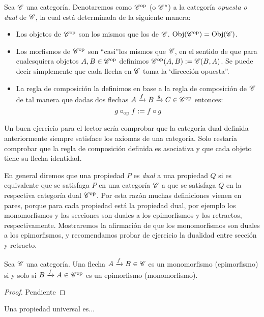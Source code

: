 \documentclass{comunicaciones}
\begin{document}
\begin{dfn}
    Sea $\mathscr C$ una categoría. Denotaremos como $\mathscr C^{\mathrm{op}}$ (o $\mathscr C^\ast$) a la categoría \emph{opuesta o dual} de $\mathscr C$, la cual está determinada de la siguiente manera:
    \begin{itemize}
        \item Los objetos de $\mathscr C^{\mathrm{op}}$ son los mismos que los de $\mathscr C$. $\mathrm{Obj}(\mathscr C^{\mathrm{op}})=\mathrm{Obj}(\mathscr C)$.
        \item Los morfismos de $\mathscr C^{\mathrm{op}}$ son \textquotedblleft casi\textquotedblright  los mismos que $\mathscr C$, en el sentido de que para cualesquiera
        objetos $A,B\in\mathscr C^{\mathrm{op}}$ definimos $\mathscr C^{\mathrm{op}}(A,B):=\mathscr C(B,A)$. Se puede decir simplemente que cada flecha en $\mathscr C$ toma la \textquoteleft dirección opuesta\textquotedblright .
        \item La regla de composición la definimos en base a la regla de composición de $\mathscr C$ de tal manera que dadas dos flechas $A\xrightarrow{f}B\xrightarrow{g}C\in\mathscr C^{\mathrm{op}}$ entonces:
        $$g\circ_{\mathrm{op}} f:=f\circ g$$
    \end{itemize}
\end{dfn}

Un buen ejercicio para el lector sería comprobar que la categoría dual definida anteriormente siempre satisface los axiomas de una categoría. Solo restaría
comprobar que la regla de composición definida es asociativa y que cada objeto tiene su flecha identidad. 

En general diremos que una propiedad $P$ es \emph{dual} a una propiedad $Q$ si es equivalente que se satisfaga $P$ en una categoría $\mathscr C$ a que se satisfaga $Q$
en la respectiva categoría dual $\mathscr C^{\mathrm{op}}$. Por esta razón muchas definiciones vienen en pares, porque para cada propiedad está la propiedad dual, por ejemplo
los monomorfismos y las secciones son duales a los epimorfismos y los retractos, respectivamente. Mostraremos la afirmación de que
los monomorfismos son duales a los epimorfismos, y recomendamos probar de ejercicio la dualidad entre sección y retracto.

\begin{prop}
    Sea $\mathscr C$ una categoría. Una flecha $A\xrightarrow{f}B\in\mathscr C$ es un monomorfismo (epimorfismo) si y solo si $B\xrightarrow{f}A\in\mathscr C^{\mathrm{op}}$ es un epimorfismo (monomorfismo).
\end{prop}
\begin{proof}
    Pendiente
\end{proof}

Una propiedad universal es...
\end{document}
